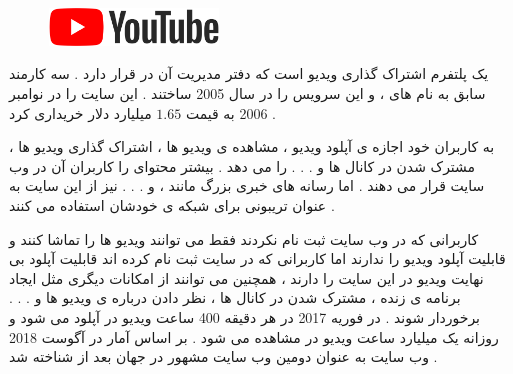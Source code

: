 \documentclass[12pt]{book}
\begin{document}
\begin{figure}
  \vspace{150pt}
  \begin{center}
    \includegraphics[width=0.4\textwidth]{./640px-YouTube_Logo_2017.svg.png}
  \end{center}
  \vspace{-20pt}
  \caption{}
  \vspace{-150pt}
\end{figure}


یک پلتفرم اشتراک گذاری ویدیو است که دفتر مدیریت آن در 
قرار دارد . 
سه کارمند سابق 
به نام های 
،
و
این سرویس را در سال 2005 ساختند . 
این سایت را در نوامبر 2006 به قیمت
$ 1.65$
 میلیارد دلار خریداری کرد .

به کاربران خود اجازه ی آپلود ویدیو ، مشاهده ی ویدیو ها ، اشتراک گذاری ویدیو ها ، مشترک شدن در کانال ها و . . . را می دهد . بیشتر محتوای
را کاربران آن در وب سایت قرار می دهند . اما رسانه های خبری  بزرگ مانند 
،
و . . . نیز از این سایت به عنوان تریبونی برای شبکه ی خودشان استفاده می کنند .

کاربرانی که در وب سایت 
ثبت نام نکردند فقط می توانند ویدیو ها را تماشا کنند و قابلیت آپلود ویدیو را ندارند اما کاربرانی که در سایت ثبت نام کرده اند قابلیت آپلود بی نهایت ویدیو در این سایت را دارند ، همچنین می توانند از امکانات دیگری مثل ایجاد برنامه ی زنده ، مشترک شدن در کانال ها ، نظر دادن درباره ی ویدیو ها و . . . برخوردار شوند .
در فوریه 2017 در هر دقیقه 400 ساعت ویدیو در 
آپلود می شود و روزانه یک میلیارد ساعت ویدیو در 
مشاهده می شود .
بر اساس آمار
در آگوست 2018
وب سایت
به عنوان دومین وب سایت مشهور در جهان بعد از 
شناخته شد .

\newpage

\subsubsection{}
\end{document}
